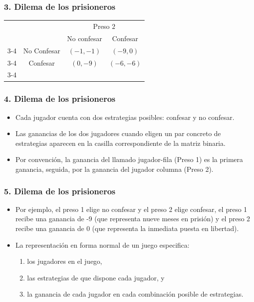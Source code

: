 \documentclass[14pt]{beamer}
\begin{document}
\begin{frame}
\frametitle{3. Dilema de los prisioneros}
\begin{table}
     \begin{tabular}{cc|c|c|}
      & \multicolumn{1}{c}{} & \multicolumn{2}{c}{Preso $2$}\\
      & \multicolumn{1}{c}{} & \multicolumn{1}{c}{No confesar}  & \multicolumn{1}{c}{Confesar} \\\cline{3-4}
      \multirow{}{Preso $1$}  & No Confesar & $(-1,-1)$ & $(-9,0)$ \\\cline{3-4}
      & Confesar & $(0,-9)$ & $(-6,-6)$ \\\cline{3-4}
    \end{tabular}
  \end{table}
\end{frame}

\begin{frame}
\frametitle{4. Dilema de los prisioneros}
\begin{itemize}
\item Cada jugador cuenta con dos estrategias posibles: confesar y no confesar. 
\item Las ganancias de los dos jugadores cuando eligen un par concreto de estrategias aparecen en la casilla correspondiente de la matriz binaria. 
\item Por convención, la ganancia del llamado jugador-fila (Preso 1) es la primera ganancia, seguida, por la ganancia del jugador columna (Preso 2). 
\end{itemize}
\end{frame}

\begin{frame}
\frametitle{5. Dilema de los prisioneros}
\begin{itemize}
\item Por ejemplo, el preso 1 elige no confesar y el preso 2 elige confesar, el preso 1 recibe una ganancia de -9 (que representa nueve meses en prisión) y el preso 2 recibe una ganancia de 0 (que representa la inmediata puesta en libertad).
\item La representación en forma normal de un juego especifica: 
\begin{enumerate}
\item [1] los jugadores en el juego,
\item [2] las estrategias de que dispone cada jugador, y 
\item [3] la ganancia de cada jugador en cada combinación posible de estrategias.
\end{enumerate}
\end{itemize}
\end{frame}
\end{document}
